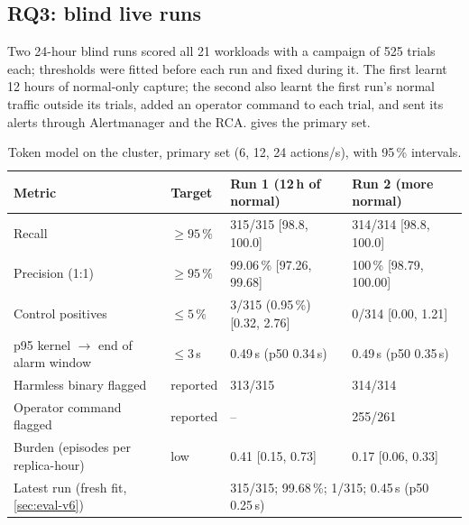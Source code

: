 \subsection{RQ3: blind live runs}\label{sec:eval-live}

Two 24-hour blind runs scored all 21 workloads with a campaign of 525 trials each; thresholds were fitted before each
run and fixed during it. The first learnt 12 hours of normal-only capture; the second also learnt the first run's
normal traffic outside its trials, added an operator command to each trial, and sent its alerts through Alertmanager
and the RCA.  gives the primary set.

\begin{table}[t]
\centering\small
\caption{Token model on the cluster, primary set (6, 12, 24 actions/s), with 95\,\% intervals.}
\label{tab:live}
\begin{tabular}{@{}llll@{}}
\toprule
Metric & Target & Run 1 (12\,h of normal) & Run 2 (more normal) \\
\midrule
Recall & $\ge 95\,\%$ & 315/315 [98.8, 100.0] & 314/314 [98.8, 100.0] \\
Precision (1:1) & $\ge 95\,\%$ & 99.06\,\% [97.26, 99.68] & 100\,\% [98.79, 100.00] \\
Control positives & $\le 5\,\%$ & 3/315 (0.95\,\%) [0.32, 2.76] & 0/314 [0.00, 1.21] \\
p95 kernel $\to$ end of alarm window & $\le 3$\,s & 0.49\,s (p50 0.34\,s) & 0.49\,s (p50 0.35\,s) \\
Harmless binary flagged & reported & 313/315 & 314/314 \\
Operator command flagged & reported & -- & 255/261 \\
Burden (episodes per replica-hour) & low & 0.41 [0.15, 0.73] & 0.17 [0.06, 0.33] \\
Latest run (fresh fit, \cref{sec:eval-v6}) & & \multicolumn{2}{l}{315/315; 99.68\,\%; 1/315; 0.45\,s (p50 0.25\,s)} \\
\bottomrule
\end{tabular}
\end{table}

